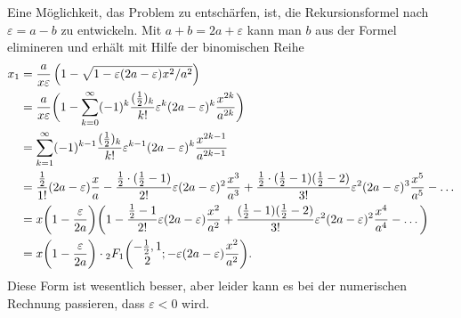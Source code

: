 Eine Möglichkeit, das Problem zu entschärfen, ist, die Rekursionsformel
nach $\varepsilon = a-b$ zu entwickeln.
Mit $a+b=2a+\varepsilon$ kann man $b$ aus der Formel elimineren und erhält
mit Hilfe der binomischen Reihe
\begin{align*}
x_1
&=
\frac{a}{x\varepsilon}
\left(1-\sqrt{1-\varepsilon(2a-\varepsilon)x^2/a^2}\right)
\\
&=
\frac{a}{x\varepsilon}
\biggl(
1-\sum_{k=0}^\infty
(-1)^k
\frac{(\frac12)_k}{k!} \varepsilon^k(2a-\varepsilon)^k\frac{x^{2k}}{a^{2k}}
\biggr)
\\
&=
\sum_{k=1}^\infty
(-1)^{k-1} 
\frac{(\frac12)_k}{k!} \varepsilon^{k-1}(2a-\varepsilon)^k\frac{x^{2k-1}}{a^{2k-1}}
\\
&=
\frac{\frac12}{1!}(2a-\varepsilon)\frac{x}{a}
-
\frac{\frac12\cdot(\frac12-1)}{2!}\varepsilon(2a-\varepsilon)^2\frac{x^3}{a^3}
+
\frac{\frac12\cdot(\frac12-1)(\frac12-2)}{3!}\varepsilon^2(2a-\varepsilon)^3\frac{x^5}{a^5}
-
\dots
\\
&=
x\biggl(1-\frac{\varepsilon}{2a}\biggr)
\biggl(
1
-
\frac{\frac12-1}{2!}\varepsilon(2a-\varepsilon)\frac{x^2}{a^2}
+
\frac{(\frac12-1)(\frac12-2)}{3!}\varepsilon^2(2a-\varepsilon)^2\frac{x^4}{a^4}
-
\dots
\biggr)
\\
&=
x\biggl(1-\frac{\varepsilon}{2a}\biggr)
\cdot
\mathstrut_2F_1\biggl(
\begin{matrix}-\frac12,1\\2\end{matrix};-\varepsilon(2a-\varepsilon)\frac{x^2}{a^2}
\biggr).
\end{align*}
Diese Form ist wesentlich besser, aber leider kann es bei der numerischen
Rechnung passieren, dass $\varepsilon < 0$ wird.

